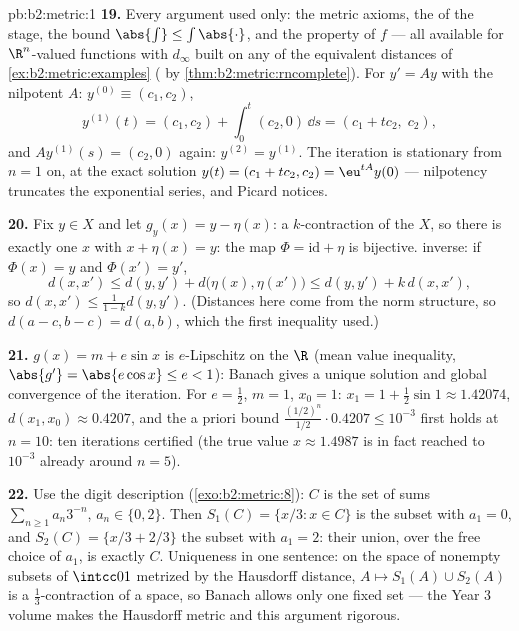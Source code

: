 \begin{solution}{pb:b2:metric:1}
\textbf{19.} Every argument used only: the metric axioms, the
 of the stage, the bound $\abs{\int} \leq
\int\abs{\cdot}$, and the  property of $f$ --- all
available for $\R^n$-valued functions with $d_\infty$ built on
any of the equivalent distances of \cref{ex:b2:metric:examples}
( by \cref{thm:b2:metric:rncomplete}). For $y' = Ay$
with the nilpotent $A$: $y^{(0)} \equiv (c_1, c_2)$,
\[
y^{(1)}(t) = (c_1, c_2) + \int_0^t (c_2, 0)\,\dd s
= (c_1 + tc_2,\; c_2),
\]
and $Ay^{(1)}(s) = (c_2, 0)$ again: $y^{(2)} = y^{(1)}$. The
iteration is stationary from $n = 1$ on, at the exact solution
$y(t) = (c_1 + tc_2, c_2) = \eu^{tA}y(0)$ --- nilpotency
truncates the exponential series, and Picard notices.

\textbf{20.} Fix $y \in X$ and let $g_y(x) = y - \eta(x)$: a
$k$-contraction of the  $X$, so there is exactly one $x$
with $x + \eta(x) = y$: the map $\Phi = \mathrm{id} + \eta$ is
bijective.  inverse: if $\Phi(x) = y$ and $\Phi(x') =
y'$,
\[
d(x, x') \leq d(y, y') + d\bigl(\eta(x), \eta(x')\bigr)
\leq d(y, y') + k\,d(x, x'),
\]
so $d(x, x') \leq \frac{1}{1-k}d(y, y')$. (Distances here come
from the norm structure, so $d(a - c, b - c) = d(a, b)$, which
the first inequality used.)

\textbf{21.} $g(x) = m + e\sin x$ is $e$-Lipschitz on the
 $\R$ (mean value inequality, $\abs{g'} = \abs{e\cos x}
\leq e < 1$): Banach gives a unique solution and global
convergence of the iteration. For $e = \frac12$, $m = 1$, $x_0
= 1$: $x_1 = 1 + \frac12\sin 1 \approx 1.42074$, $d(x_1, x_0)
\approx 0.4207$, and the a priori bound
$\frac{(1/2)^n}{1/2}\cdot 0.4207 \leq 10^{-3}$ first holds at
$n = 10$: ten iterations certified (the true value $x \approx
1.4987$ is in fact reached to $10^{-3}$ already around $n =
5$).

\textbf{22.} Use the digit description
(\cref{exo:b2:metric:8}): $C$ is the set of sums
$\sum_{n\geq1}a_n3^{-n}$, $a_n \in \{0, 2\}$. Then $S_1(C) =
\{x/3 : x \in C\}$ is the subset with $a_1 = 0$, and $S_2(C) =
\{x/3 + 2/3\}$ the subset with $a_1 = 2$: their union, over the
free choice of $a_1$, is exactly $C$. Uniqueness in one
sentence: on the space of nonempty  subsets of
$\intcc01$ metrized by the Hausdorff distance, $A \mapsto
S_1(A) \cup S_2(A)$ is a $\frac13$-contraction of a 
space, so Banach allows only one fixed set --- the Year 3
volume makes the Hausdorff metric and this argument rigorous.


\end{solution}

